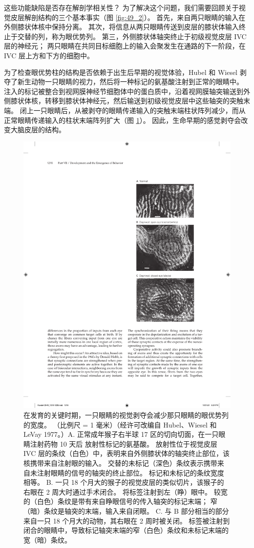 这些功能缺陷是否存在解剖学相关性？ 为了解决这个问题，我们需要回顾关于视觉皮层解剖结构的三个基本事实（图 \ref{fig:49_2}）。 首先，来自两只眼睛的输入在外侧膝状体核中保持分离。 其次，将信息从两只眼睛传送到皮层的膝状体输入终止于交替的列，称为眼优势列。 第三，外侧膝状体轴突终止于初级视觉皮层 IVC 层的神经元； 两只眼睛在共同目标细胞上的输入会聚发生在通路的下一阶段，在 IVC 层上方和下方的细胞中。

为了检查眼优势柱的结构是否依赖于出生后早期的视觉体验，Hubel 和 Wiesel 剥夺了新生动物一只眼睛的视力，然后将一种标记的氨基酸注射到正常的眼睛中。 注入的标记被整合到视网膜神经节细胞体中的蛋白质中，沿着视网膜轴突输送到外侧膝状体核，转移到膝状体神经元，然后输送到初级视觉皮层中这些轴突的突触末端。 
闭上一只眼睛后，从被剥夺的眼睛传递输入的突触末端柱状阵列减少，而从正常眼睛传递输入的柱状末端阵列扩大（图 \ref{fig:49_4}）。 
因此，生命早期的感觉剥夺会改变大脑皮层的结构。

\begin{figure}[htbp]
	\centering
	\includegraphics[width=0.5\linewidth]{chap49/fig_49_4}
	\caption{在发育的关键时期，一只眼睛的视觉剥夺会减少那只眼睛的眼优势列的宽度。 （比例尺 = 1 毫米）（经许可改编自 Hubel、Wiesel 和 LeVay 1977。）A. 正常成年猴子右半球 17 区的切向切面，在一只眼睛注射药物 10 天后 放射性标记的氨基酸。 放射性位于视觉皮层 IVC 层的条纹（白色）中，表明来自外侧膝状体的轴突终止部位，该核携带来自注射眼的输入。 交替的未标记（深色）条纹表示携带来自未注射眼睛的信号的轴突的终止部位。 标记和未标记的条纹宽度相等。 B. 一只 18 个月大的猴子的视觉皮层的类似切片，该猴子的右眼在 2 周大时通过手术闭合。 将标签注射到左（睁）眼中。 较宽的（白色）条纹是带有来自睁眼信号的传入轴突的标记末端； 窄（暗）条纹是轴突的末端，输入来自闭眼。 C. 与 B 部分相当的部分来自一只 18 个月大的动物，其右眼在 2 周时被关闭。 标签被注射到闭合的眼睛中，导致标记轴突末端的窄（白色）条纹和未标记末端的宽（暗）条纹。}
	\label{fig:49_4}
\end{figure}


